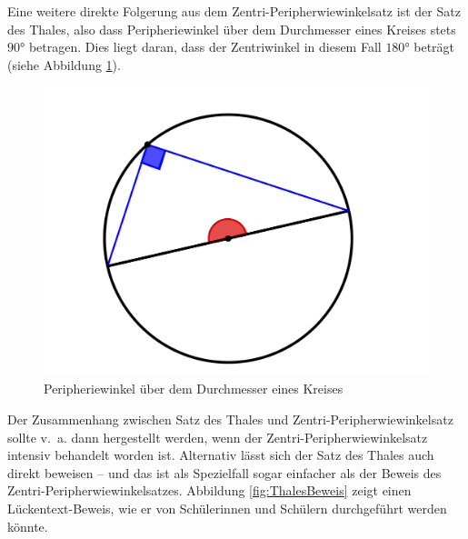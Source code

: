 \documentclass[
  ngerman,
]{scrbook}
\theoremstyle{definition}
\theoremstyle{definition}
\theoremstyle{definition}
\theoremstyle{definition}
\theoremstyle{remark}
\begin{document}
Eine weitere direkte Folgerung aus dem Zentri-Peripherwiewinkelsatz ist der Satz des Thales, also dass Peripheriewinkel über dem Durchmesser eines Kreises stets \(90°\) betragen. Dies liegt daran, dass der Zentriwinkel in diesem Fall \(180°\) beträgt (siehe Abbildung \ref{fig:Thales}).

\begin{figure}

{\centering \includegraphics[width=0.75\linewidth]{pictures/C-Thales} 

}

\caption{Peripheriewinkel über dem Durchmesser eines Kreises}\label{fig:Thales}
\end{figure}

Der Zusammenhang zwischen Satz des Thales und Zentri-Peripherwiewinkelsatz sollte v.~a. dann hergestellt werden, wenn der Zentri-Peripherwiewinkelsatz intensiv behandelt worden ist. Alternativ lässt sich der Satz des Thales auch direkt beweisen -- und das ist als Spezielfall sogar einfacher als der Beweis des Zentri-Peripherwiewinkelsatzes. Abbildung \ref{fig:ThalesBeweis} zeigt einen Lückentext-Beweis, wie er von Schülerinnen und Schülern durchgeführt werden könnte.
\end{document}
